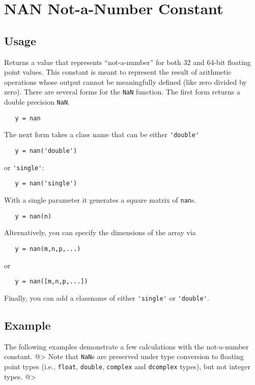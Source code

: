 \section{NAN Not-a-Number Constant}

\subsection{Usage}

Returns a value that represents ``not-a-number'' for both 32 and 64-bit 
floating point values.  This constant is meant to represent the result of
arithmetic operations whose output cannot be meaningfully defined (like 
zero divided by zero).  There are several forms for the \verb|NaN| function.
The first form returns a double precision \verb|NaN|.
\begin{verbatim}
   y = nan
\end{verbatim}
The next form takes a class name that can be either \verb|'double'| 
\begin{verbatim}
   y = nan('double')
\end{verbatim}
or \verb|'single'|:
\begin{verbatim}
   y = nan('single')
\end{verbatim}
With a single parameter it generates a square matrix of \verb|nan|s.
\begin{verbatim}
   y = nan(n)
\end{verbatim}
Alternatively, you can specify the dimensions of the array via
\begin{verbatim}
   y = nan(m,n,p,...)
\end{verbatim}
or
\begin{verbatim}
   y = nan([m,n,p,...])
\end{verbatim}
Finally, you can add a classname of either \verb|'single'| or \verb|'double'|.
\subsection{Example}

The following examples demonstrate a few calculations with the not-a-number constant.
@>
Note that \verb|NaN|s are preserved under type conversion to floating point types (i.e., \verb|float|, \verb|double|, \verb|complex| and \verb|dcomplex| types), but not integer  types.
@>
